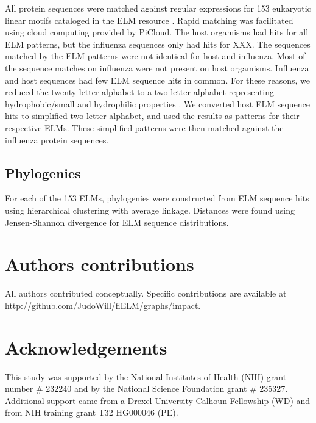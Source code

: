 \documentclass[10pt]{bmc_article}
\newenvironment{bmcformat}{\begin{raggedright}\baselineskip20pt\sloppy\setboolean{publ}{false}}{\end{raggedright}\baselineskip20pt\sloppy}
\begin{document}
\begin{bmcformat}
All protein sequences were matched against regular expressions for 153
eukaryotic linear motifs cataloged in the ELM resource
\cite{gould2010elm}. Rapid matching was facilitated using cloud
computing provided by PiCloud. The host orgamisms had hits for all ELM
patterns, but the influenza sequences only had hits for XXX. The
sequences matched by the ELM patterns were not identical for host and
influenza. Most of the sequence matches on influenza were not present
on host orgamisms. Influenza and host sequences had few ELM sequence
hits in common. For these reasons, we reduced the twenty letter
alphabet to a two letter alphabet representing hydrophobic/small and
hydrophilic properties \cite{murphy2000simplified}. We converted host
ELM sequence hits to simplified two letter alphabet, and used the
results as patterns for their respective ELMs. These simplified
patterns were then matched against the influenza protein sequences.

\subsection*{Phylogenies}
For each of the 153 ELMs, phylogenies were constructed from ELM
sequence hits using hierarchical clustering with average
linkage. Distances were found using Jensen-Shannon divergence for ELM
sequence distributions.

\section*{Authors contributions}
    All authors contributed conceptually. Specific contributions are
    available at http://github.com/JudoWill/flELM/graphs/impact.

\section*{Acknowledgements}
  This study was supported by the National Institutes of Health
  (NIH) grant number \# 232240 and by the National Science Foundation
  grant \# 235327. Additional support came from a Drexel University
  Calhoun Fellowship (WD) and from NIH training grant T32 HG000046
  (PE).
 


\end{bmcformat}
\end{document}
